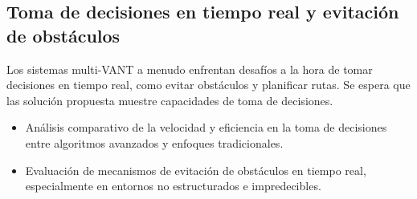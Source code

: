 \documentclass[sigconf]{acmart}
\begin{document}



\subsection*{Toma de decisiones en tiempo real y evitación de obstáculos}

Los sistemas multi-VANT a menudo enfrentan desafíos a la hora de tomar decisiones en tiempo real, como evitar obstáculos y planificar rutas. Se espera que las solución propuesta muestre capacidades de toma de decisiones.

\begin{itemize}
\item Análisis comparativo de la velocidad y eficiencia en la toma de decisiones entre algoritmos avanzados y enfoques tradicionales.
\item Evaluación de mecanismos de evitación de obstáculos en tiempo real, especialmente en entornos no estructurados e impredecibles.
\end{itemize}



\end{document}
